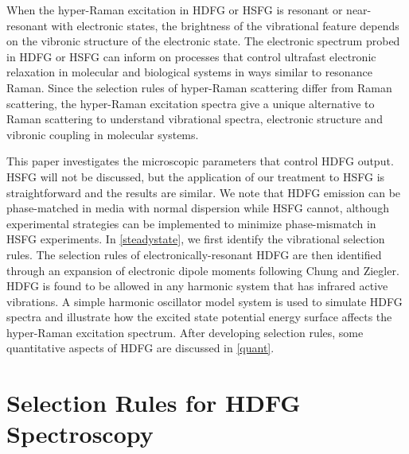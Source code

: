 \documentclass[aip, jcp, reprint, onecolumn, nofootinbib]{revtex4-2}
\begin{document}
When the hyper-Raman excitation in HDFG or HSFG is resonant or near-resonant with electronic states, the brightness of the vibrational feature depends on the vibronic structure of the electronic state.
The electronic spectrum probed in HDFG or HSFG can inform on processes that control ultrafast electronic relaxation in molecular and biological systems in ways similar to resonance Raman.\cite{Cho2001, Bredenbeck2015, Arsenault2021}
Since the selection rules of hyper-Raman scattering differ from Raman scattering, the hyper-Raman excitation spectra give a unique alternative to Raman scattering to understand vibrational spectra, electronic structure and vibronic coupling in molecular systems. \cite{Olson2018}

This paper investigates the microscopic parameters that control HDFG output. \cite{RN352, Bonn2024, McDonnell2024}
HSFG will not be discussed, but the application of our treatment to HSFG is straightforward and the results are similar.
We note that HDFG emission can be phase-matched in media with normal dispersion while HSFG cannot,\cite{RN279, RN278} although experimental strategies can be implemented to minimize phase-mismatch in HSFG experiments. \cite{Kaufman2024}  
In \autoref{steadystate}, we first identify the vibrational selection rules. 
The selection rules of electronically-resonant HDFG are then identified through an expansion of electronic dipole moments following Chung and Ziegler.\cite{Ziegler1988}
HDFG is found to be allowed in any harmonic system that has infrared active vibrations.
A simple harmonic oscillator model system is used to simulate HDFG spectra and illustrate how the excited state potential energy surface affects the hyper-Raman excitation spectrum.
After developing selection rules, some quantitative aspects of HDFG are discussed in \autoref{quant}.

\section{Selection Rules for HDFG Spectroscopy}\label{steadystate}
\end{document}
